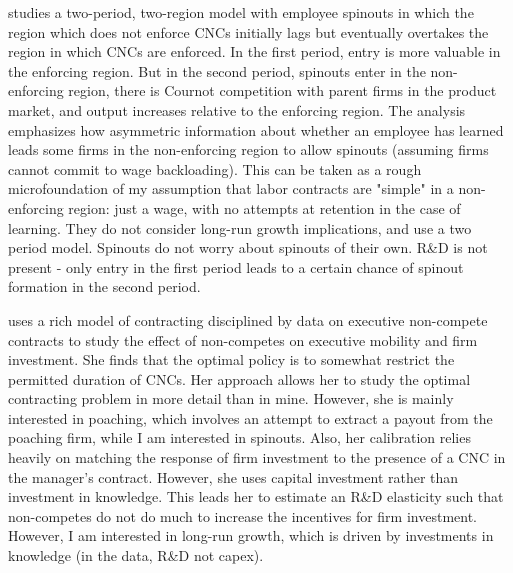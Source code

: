 \documentclass[11pt,english]{article}
\theoremstyle{remark}
\begin{document}
\cite{franco_covenants_2008} studies a two-period, two-region model with employee spinouts in which the region which does not enforce CNCs initially lags but eventually overtakes the region in which CNCs are enforced. In the first period, entry is more valuable in the enforcing region. But in the second period, spinouts enter in the non-enforcing region, there is Cournot competition with parent firms in the product market, and output increases relative to the enforcing region. The analysis emphasizes how asymmetric information about whether an employee has learned leads some firms in the non-enforcing region to allow spinouts (assuming firms cannot commit to wage backloading). This can be taken as a rough microfoundation of my assumption that labor contracts are "simple" in  a non-enforcing region: just a wage, with no attempts at retention in the case of learning. They do not consider long-run growth implications, and use a two period model. Spinouts do not worry about spinouts of their own. R\&D is not present - only entry in the first period leads to a certain chance of spinout formation in the second period. 

\cite{shi_restrictions_2018} uses a rich model of contracting disciplined by data on executive non-compete contracts to study the effect of non-competes on executive mobility and firm investment. She finds that the optimal policy is to somewhat restrict the permitted duration of CNCs. Her approach allows her to study the optimal contracting problem in more detail than in mine. However, she is mainly interested in poaching, which involves an attempt to extract a payout from the poaching firm, while I am interested in spinouts. Also, her calibration relies heavily on matching the response of firm investment to the presence of a CNC in the manager's contract. However, she uses capital investment rather than investment in knowledge. This leads her to estimate an R\&D elasticity such that non-competes do not do much to increase the incentives for firm investment. However, I am interested in long-run growth, which is driven by investments in knowledge (in the data, R\&D not capex).
\end{document}
